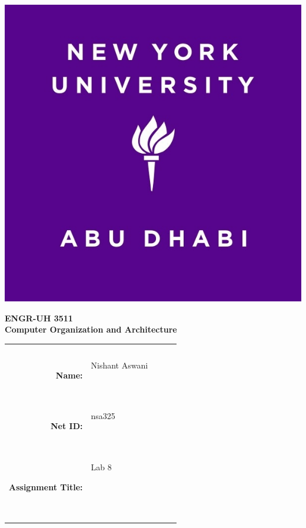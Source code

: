\documentclass[twocolumn]{article}
\title{\myassignmenttitle}
\author{\myname, \myemail}
\affil{\myclassname (\mycoursenumber), Instructor \myinstructor}
\date{}
\newcommand{\myname}{Nishant Aswani}
\newcommand{\mynetid}{nsa325}
\newcommand{\myhwtype}{Lab }
\newcommand{\myhwnum}{8}
\newcommand{\mycoursenumber}{ENGR-UH 3511}
\newcommand{\myclassname}{Computer Organization and Architecture}
\begin{document}
\onecolumn
\pagestyle{fancy}
\fancyhf{}
\renewcommand{\headrulewidth}{0pt}

\begin{center}
  \includegraphics[scale=0.15]{etc/NYUAD-alt-logo.jpg}
\end{center}

{\vspace{2.5em}}

\begin{center}
    \Huge{\textbf{\mycoursenumber}}\\
    {\vspace{0.5em}}
    \Huge{\textbf{\myclassname}}
\end{center}

{\vspace{10em}}

\begin{center}
  \begin{tabular}{|rp{5.0cm}lll|}
    \hline
    &  &  &  & \\
    &  &  &  & \\
    \Large{\textbf{Name:}} & \Large{\myname}
    
    \  &  &  & \\
    \Large{\textbf{Net ID:}} & \Large{\mynetid}
    
    \  &  &  & \\
    \Large{\textbf{Assignment Title:}} & \Large{\myhwtype \myhwnum}
    
    \
    
    \  &  &  & \\
    \hline
  \end{tabular}
\end{center}
\end{document}
